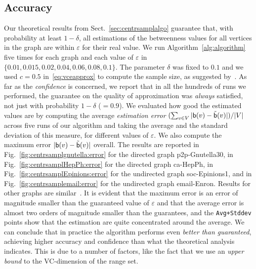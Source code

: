 \subsection{Accuracy}\label{sec:centrsamplaccuracy}
Our theoretical results from Sect.~\ref{sec:centrsamplalgo} guarantee that, with probability
at least $1-\delta$, all estimations of the betweenness values for all vertices
in the graph are within $\varepsilon$ for their real value. %
We run Algorithm~\ref{alg:algorithm} five times for each graph and each value of
$\varepsilon$ in $\{0.01, 0.015, 0.02, 0.04, 0.06, 0.08, 0.1\}$. The parameter
$\delta$ was fixed to $0.1$ and we used $c=0.5$ in~\eqref{eq:vceapprox} to
compute the sample size, as suggested by~\citet{LofflerP09}. As far as the
\emph{confidence} is concerned, we report that in all the hundreds of runs we
performed, the guarantee on the quality of approximation was \emph{always} satisfied, not just
with probability $1-\delta$ ($=0.9$). We evaluated how good the estimated values
are by computing the average \emph{estimation error} $(\sum_{v\in
V}|\mathsf{b}(v)-\tilde{\mathsf{b}}(v)|)/|V|$ across five runs of our algorithm and taking
the average and the standard deviation of this measure, for different values of
$\varepsilon$. We also compute the maximum error $|\mathsf{b}(v)-\tilde{\mathsf{b}}(v)|$
overall. The results are reported in Fig.~\ref{fig:centrsamplgnutella:error} for the directed
graph p2p-Gnutella30, %
\ifproof
in Fig.~\ref{fig:centrsamplHepPh:error} for the directed graph ca-HepPh, in
Fig.~\ref{fig:centrsamplEpinions:error} for the undirected graph soc-Epinions1, %
\fi
and in Fig.~\ref{fig:centrsamplemail:error} for the undirected graph
email-Enron. %
\ifproof
\else
Results for other graphs are similar~\citep{RiondatoK13}. %
\fi
It is
evident that the maximum error is an error of magnitude smaller than the
guaranteed value of $\varepsilon$ and that the average error is almost two
orders of magnitude smaller than the guarantees, and the \texttt{Avg+Stddev}
points show that the estimation are quite concentrated around the
average. We can conclude that in practice the algorithm performs even \emph{better
than guaranteed}, achieving higher accuracy and confidence than what the
theoretical analysis indicates. This is due to a number of factors, like the
fact that we use an \emph{upper bound} to the VC-dimension of the range set. 

